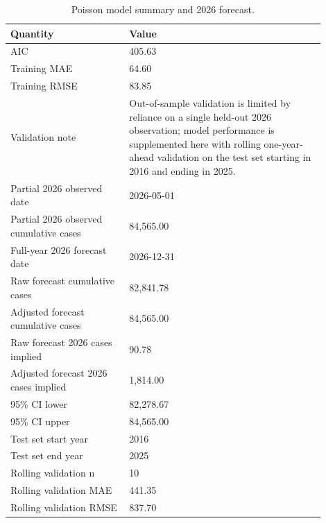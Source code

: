 \begin{table}[H]
\centering
\caption{Poisson model summary and 2026 forecast.}
\label{tab:poisson_summary}
\small
\begin{tabular}{p{0.34\linewidth}p{0.56\linewidth}}
\toprule
Quantity & Value \\
\midrule
AIC & 405.63 \\
Training MAE & 64.60 \\
Training RMSE & 83.85 \\
Validation note & Out-of-sample validation is limited by reliance on a single held-out 2026 observation; model performance is supplemented here with rolling one-year-ahead validation on the test set starting in 2016 and ending in 2025. \\
Partial 2026 observed date & 2026-05-01 \\
Partial 2026 observed cumulative cases & 84,565.00 \\
Full-year 2026 forecast date & 2026-12-31 \\
Raw forecast cumulative cases & 82,841.78 \\
Adjusted forecast cumulative cases & 84,565.00 \\
Raw forecast 2026 cases implied & 90.78 \\
Adjusted forecast 2026 cases implied & 1,814.00 \\
95\% CI lower & 82,278.67 \\
95\% CI upper & 84,565.00 \\
Test set start year & 2016 \\
Test set end year & 2025 \\
Rolling validation n & 10 \\
Rolling validation MAE & 441.35 \\
Rolling validation RMSE & 837.70 \\
\bottomrule
\end{tabular}
\end{table}

